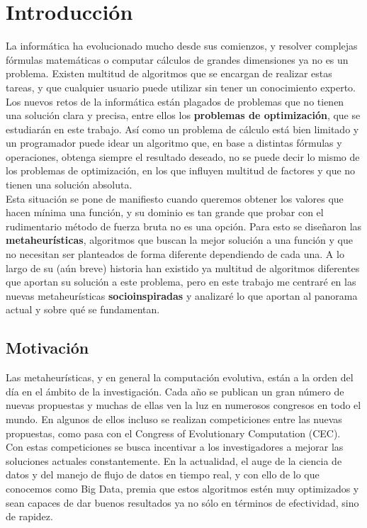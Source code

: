 \chapter{Introducción}

La informática ha evolucionado mucho desde sus comienzos, y resolver complejas fórmulas matemáticas o computar cálculos de grandes dimensiones ya no es un problema. Existen multitud de algoritmos que se encargan de realizar estas tareas, y que cualquier usuario puede utilizar sin tener un conocimiento experto. Los nuevos retos de la informática están plagados de problemas que no tienen una solución clara y precisa, entre ellos los \textbf{problemas de optimización}, que se estudiarán en este trabajo. Así como un problema de cálculo está bien limitado y un programador puede idear un algoritmo que, en base a distintas fórmulas y operaciones, obtenga siempre el resultado deseado, no se puede decir lo mismo de los problemas de optimización, en los que influyen multitud de factores y que no tienen una solución absoluta.\\

Esta situación se pone de manifiesto cuando queremos obtener los valores que hacen mínima una función, y su dominio es tan grande que probar con el rudimentario método de fuerza bruta no es una opción. Para esto se diseñaron las \textbf{metaheurísticas}, algoritmos que buscan la mejor solución a una función y que no necesitan ser planteados de forma diferente dependiendo de cada una. A lo largo de su (aún breve) historia han existido ya multitud de algoritmos diferentes que aportan su solución a este problema, pero en este trabajo me centraré en las nuevas metaheurísticas \textbf{socioinspiradas} y analizaré lo que aportan al panorama actual y sobre qué se fundamentan.

\section{Motivación}

Las metaheurísticas, y en general la computación evolutiva, están a la orden del día en el ámbito de la investigación. Cada año se publican un gran número de nuevas propuestas y muchas de ellas ven la luz en numerosos congresos en todo el mundo. En algunos de ellos incluso se realizan competiciones entre las nuevas propuestas, como pasa con el Congress of Evolutionary Computation (CEC).\\

Con estas competiciones se busca incentivar a los investigadores a mejorar las soluciones actuales constantemente. En la actualidad, el auge de la ciencia de datos y del manejo de flujo de datos en tiempo real, y con ello de lo que conocemos como Big Data, premia que estos algoritmos estén muy optimizados y sean capaces de dar buenos resultados ya no sólo en términos de efectividad, sino de rapidez.\\

